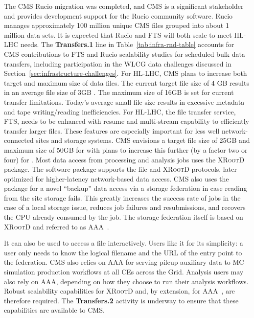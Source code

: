The CMS Rucio migration was completed, and CMS is a significant stakeholder and provides development support for the Rucio community software. Rucio manages approximately 100 million unique CMS files grouped into about 1 million data sets. It is expected that Rucio and \gls{FTS} will both scale to meet \gls{HL-LHC} needs. The \textbf{Transfers.1} line in Table~\ref{tab:infra-rnd-table} accounts for CMS contributions to \gls{FTS} and Rucio scalability studies for scheduled bulk data transfers, including participation in the \gls{WLCG} data challenges discussed in Section~\ref{sec:infrastructure-challenges}.
For HL-LHC, CMS plans to increase both target and maximum size of data files. The current target file size of 4 \unit{GB} results in an average file size of 3\unit{GB} . The maximum size of 16\unit{GB} is set for current transfer limitations. Today's average small file size results in excessive metadata and tape writing/reading inefficiencies. For HL-LHC, the file transfer service, \gls{FTS}, needs to be enhanced with resume and multi-stream capability to efficiently transfer larger files.
These features are especially important for less well network-connected sites and storage systems. CMS envisions a target file size of 25\unit{GB}  and maximum size of 50\unit{GB} for \RunFour with plans to increase this further (by a factor two or four) for \RunFive.
Most data access from processing and analysis jobs uses the \textsc{XRootD}~\cite{CMS:2014cof} package. The software package supports the file and \textsc{XRootD} protocols, later optimized for higher-latency network-based data access. CMS also uses the package for a novel ``backup'' data access via a storage federation in case reading from the site storage fails. This greatly increases the success rate of jobs in the case of a local storage issue, reduces job failures and resubmissions, and recovers the \gls{CPU} already consumed by the job. The storage federation itself is based on \textsc{XRootD} and referred to as \gls{AAA}~\cite{Bloom:2015poa}. 

It can also be used to access a file interactively. Users like it for its simplicity: a user only needs to know the logical filename and the \gls{URL} of the entry point to the federation. CMS also relies on \gls{AAA} for serving pileup auxiliary data to \gls{MC} simulation production workflows at all CEs across the Grid. Analysis users may also rely on \gls{AAA}, depending on how they choose to run their analysis workflows. Robust scalability capabilities for \textsc{XRootD} and, by extension, for \gls{AAA}~\cite{400GbpsXRootD}, are therefore required. The \textbf{Transfers.2} activity is underway to ensure that these capabilities are available to CMS.

